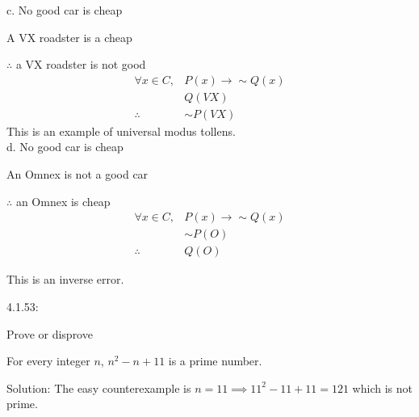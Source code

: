 \documentclass[16 pt]{amsart}
\theoremstyle{definition}
\theoremstyle{remark}
\numberwithin{equation}{subsection}
\begin{document}
c. No good car is cheap

A VX roadster is a cheap

$\therefore$ a VX roadster is not good\\

\begin{eqnarray*}
\forall x\in C, & P(x) \rightarrow \sim Q(x)\\
 & Q(VX)\\
\therefore & \sim P(VX)
\end{eqnarray*}
This is an example of universal modus tollens.\\


d. No good car is cheap

An Omnex  is not a good car

$\therefore$ an Omnex is cheap\\

\begin{eqnarray*}
\forall x\in C, & P(x) \rightarrow \sim Q(x)\\
 & \sim P(O)\\
\therefore & Q(O)
\end{eqnarray*}

This is an inverse error.


\newpage

4.1.53:

Prove or disprove

For every integer $n$, $n^2-n+11$ is a prime number.

\vspace{1in}

Solution: The easy counterexample is  $n=11 \implies 11^2 - 11 + 11 = 121$ which is not prime.
\end{document}
